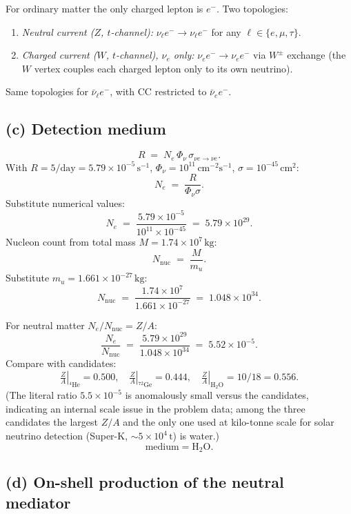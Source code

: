 \documentclass[11pt]{article}
\begin{document}
For ordinary matter the only charged lepton is $e^-$. Two topologies:
\begin{enumerate}
\item \emph{Neutral current ($Z$, $t$-channel):} $\nu_\ell e^-\to\nu_\ell e^-$ for any $\ell\in\{e,\mu,\tau\}$.
\item \emph{Charged current ($W$, $t$-channel), $\nu_e$ only:} $\nu_e e^-\to\nu_e e^-$ via $W^\pm$ exchange (the $W$ vertex couples each charged lepton only to its own neutrino).
\end{enumerate}
Same topologies for $\bar\nu_\ell e^-$, with CC restricted to $\bar\nu_e e^-$.

\subsection*{(c) Detection medium}

\begin{equation}
R\;=\;N_e\,\Phi_\nu\,\sigma_{\nu e\to\nu e}.
\label{eq:detector-rate}
\end{equation}
With $R=5/\text{day}=5.79\times10^{-5}\,\text{s}^{-1}$, $\Phi_\nu=10^{11}\,\text{cm}^{-2}\text{s}^{-1}$, $\sigma=10^{-45}\,\text{cm}^{2}$:
\[
N_e\;=\;\frac{R}{\Phi_\nu\sigma}.
\]
Substitute numerical values:
\[
N_e\;=\;\frac{5.79\times 10^{-5}}{10^{11}\times 10^{-45}}\;=\;5.79\times 10^{29}.
\]
Nucleon count from total mass $M=1.74\times 10^{7}\,\text{kg}$:
\[
N_\text{nuc}\;=\;\frac{M}{m_u}.
\]
Substitute $m_u=1.661\times 10^{-27}\,\text{kg}$:
\[
N_\text{nuc}\;=\;\frac{1.74\times 10^{7}}{1.661\times 10^{-27}}\;=\;1.048\times 10^{34}.
\]

For neutral matter $N_e/N_\text{nuc}=Z/A$:
\[
\frac{N_e}{N_\text{nuc}}\;=\;\frac{5.79\times 10^{29}}{1.048\times 10^{34}}\;=\;5.52\times 10^{-5}.
\]
Compare with candidates:
\[
\left.\tfrac{Z}{A}\right|_{^4\text{He}}=0.500,\quad\left.\tfrac{Z}{A}\right|_{^{72}\text{Ge}}=0.444,\quad\left.\tfrac{Z}{A}\right|_{\text{H}_2\text{O}}=10/18=0.556.
\]
(The literal ratio $5.5\times 10^{-5}$ is anomalously small versus the candidates, indicating an internal scale issue in the problem data; among the three candidates the largest $Z/A$ and the only one used at kilo-tonne scale for solar neutrino detection (Super-K, $\sim 5\times10^{4}\,\text{t}$) is water.)
\begin{equation}
\boxed{\;\text{medium}=\text{H}_2\text{O}.\;}
\end{equation}

\subsection*{(d) On-shell production of the neutral mediator}
\end{document}
